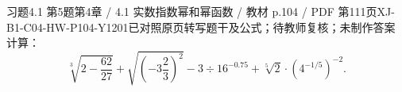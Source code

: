 \par\noindent\begin{minipage}{\linewidth}
\begin{bankitem}{习题4.1 第5题}{第4章 / 4.1 实数指数幂和幂函数 / 教材 p.104 / PDF 第111页}{XJ-B1-C04-HW-P104-Y1201}{已对照原页转写题干及公式；待教师复核；未制作答案}
计算：
\[\sqrt[3]{2-\frac{62}{27}}+\sqrt{\left(-3\frac23\right)^2}-3\div16^{-0.75}+\sqrt[5]2\cdot\left(4^{-1/5}\right)^{-2}.\]
\end{bankitem}
\end{minipage}\par\medskip

